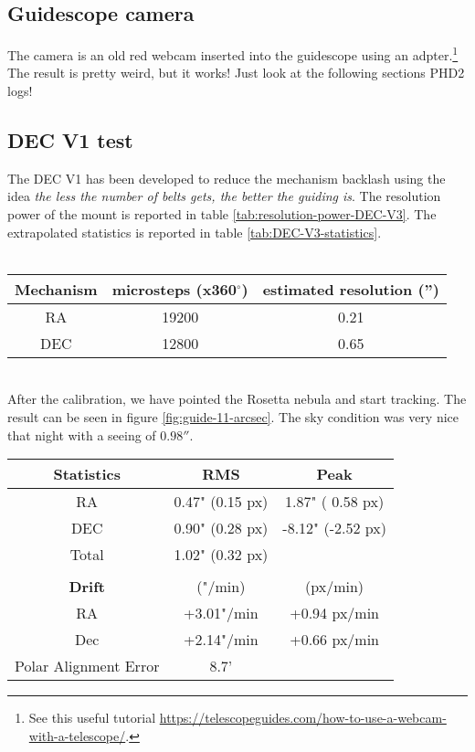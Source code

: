 \subsection{Guidescope camera}
The camera is an old red webcam inserted into the guidescope using an adpter.\footnote{See this useful tutorial \url{https://telescopeguides.com/how-to-use-a-webcam-with-a-telescope/}.}
The result is pretty weird, but it works!
Just look at the following sections PHD2 logs!

\subsection{DEC V1 test}
The DEC V1 has been developed to reduce the mechanism backlash using the idea \textit{the less the number of belts gets, the better the guiding is}.
The resolution power of the mount is reported in table \ref{tab:resolution-power-DEC-V3}.
The extrapolated statistics is reported in table \ref{tab:DEC-V3-statistics}.
\\
\\
\begin{minipage}
    {.5\textwidth}
    \begin{tabular}{c|c|c}
        \hline
        \textbf{Mechanism} & \textbf{microsteps (x360$^{\circ}$)} &\textbf{estimated resolution ('')}\\
        \hline
        RA  & 19200 & 0.21\\ 
        DEC & 12800 & 0.65\\
        \hline
    \end{tabular}
    \label{tab:resolution-power-DEC-V3}
\end{minipage}
\\
After the calibration, we have pointed the Rosetta nebula and start tracking.
The result can be seen in figure \ref{fig:guide-11-arcsec}.
The sky condition was very nice that night with a seeing of \(0.98''\).
\\
\begin{minipage}{.4\textwidth}
    \centering
    \begin{tabular}{ccc}
        \textbf{Statistics}&RMS&Peak\\
        \hline
        RA& 0.47" (0.15 px)& 1.87" ( 0.58 px)\\
        DEC& 0.90" (0.28 px)&-8.12" (-2.52 px)\\
        Total& 1.02" (0.32 px)&\\
        \hline
        \\
        \textbf{Drift}& ("/min) & (px/min)\\
        \hline
        RA& +3.01"/min& +0.94 px/min\\
        Dec& +2.14"/min& +0.66 px/min\\
        Polar Alignment Error& 8.7'&\\
        \hline
    \end{tabular}
    \label{tab:DEC-V3-statistics}
\end{minipage}

